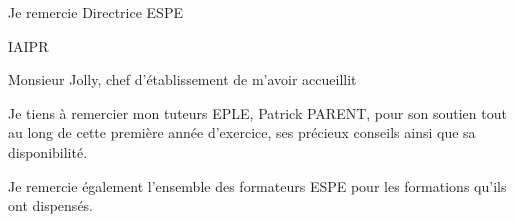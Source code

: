 
Je remercie Directrice ESPE


IAIPR


Monsieur Jolly, chef d'établissement de m'avoir accueillit


Je tiens à remercier mon tuteurs EPLE, Patrick PARENT, pour son soutien tout au long de cette première année d'exercice, ses précieux conseils ainsi que sa disponibilité.

Je remercie également l'ensemble des formateurs ESPE pour les formations qu'ils ont dispensés.




